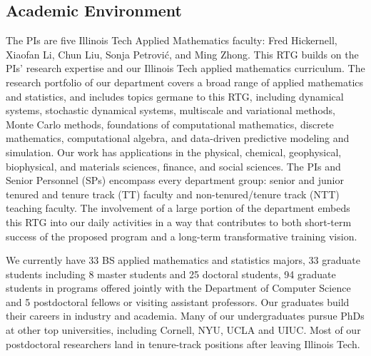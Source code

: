\documentclass[11pt]{NSFamsart}
\newcommand{\numUG}{33\xspace}
\newcommand{\numMS}{8\xspace}
\newcommand{\numPHD}{25\xspace}
\newcommand{\numGrad}{33\xspace}
\newcommand{\numPostDoc}{5\xspace}
\newcommand{\numjoint}{94\xspace}
\begin{document}
\subsection*{Academic Environment} The PIs are five Illinois Tech Applied Mathematics faculty:  %
Fred Hickernell, Xiaofan Li, Chun Liu, Sonja Petrovi\'c, and Ming Zhong. This RTG builds on the PIs' research expertise and our Illinois Tech applied mathematics curriculum.   The research portfolio of our department covers a broad range of applied mathematics and statistics, and includes topics germane to this RTG, including dynamical systems, stochastic dynamical systems, multiscale and variational methods,  Monte Carlo methods, foundations of computational mathematics, discrete mathematics, computational algebra, and data-driven predictive modeling and simulation. Our work has applications in the physical, chemical, geophysical, biophysical, and materials sciences, finance, and social sciences. 
The PIs and Senior Personnel (SPs) encompass every department group: senior and junior tenured and tenure track (TT) faculty and non-tenured/tenure track (NTT) teaching faculty. The involvement of a large portion of the department embeds this RTG into our daily activities in a way that contributes to both short-term success of the proposed program and a long-term transformative training vision. 

 We currently have \numUG BS applied mathematics and statistics majors, \numGrad graduate students including \numMS master students and \numPHD doctoral students, \numjoint graduate students in programs offered jointly with the Department of Computer Science and \numPostDoc postdoctoral fellows or visiting assistant professors. Our graduates build their careers in  industry  and academia. Many of our undergraduates pursue PhDs at other top universities, including Cornell, NYU, UCLA and UIUC. Most of our postdoctoral researchers land in tenure-track positions after leaving Illinois Tech.
\end{document}
